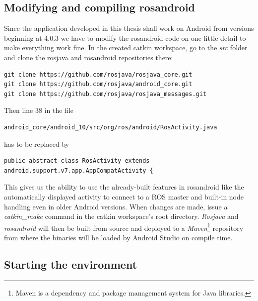 \subsection{Modifying and compiling rosandroid}
\label{impl:compiling_rosandroid}

Since the application developed in this thesis shall work on Android from versions beginning at 4.0.3 we have to modify the rosandroid code on one little detail to make everything work fine. In the created catkin workspace, go to the \textit{src} folder and clone the rosjava and rosandroid repositories there:
\begin{lstlisting}[caption={Cloning the rosandroid and rosjava repositories}]
git clone https://github.com/rosjava/rosjava_core.git
git clone https://github.com/rosjava/android_core.git
git clone https://github.com/rosjava/rosjava_messages.git
\end{lstlisting}

Then line 38 in the file
\begin{lstlisting}[numbers=none]
android_core/android_10/src/org/ros/android/RosActivity.java
\end{lstlisting}

has to be replaced by

\begin{lstlisting}[caption={Change to make to RosActivity.java},firstnumber=38]
public abstract class RosActivity extends android.support.v7.app.AppCompatActivity {
\end{lstlisting}

This gives us the ability to use the already-built features in rosandroid like the automatically displayed activity to connect to a ROS master and built-in node handling even in older Android versions. When changes are made, issue a \textit{catkin\_make} command in the catkin workspace's root directory. \textit{Rosjava} and \textit{rosandroid} will then be built from source and deployed to a \textit{Maven}\footnote{Maven is a dependency and package management system for Java libraries.} repository from where the binaries will be loaded by Android Studio on compile time.

\subsection{Starting the environment}

